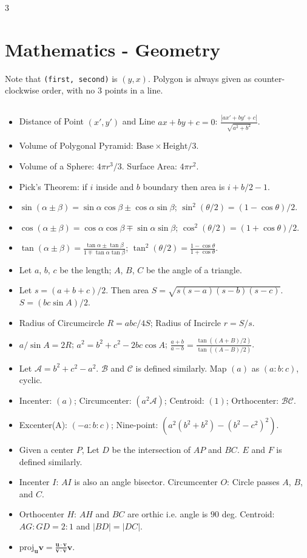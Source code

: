 \documentclass[landscape, 8pt, a4paper, oneside]{extarticle}
\begin{document}
\begin{multicols*}{3}
\section{Mathematics - Geometry}
Note that \texttt{(first, second)} is $(y, x)$.
Polygon is always given as counter-clockwise order, with no $3$ points in a line.
\subsection{}
\begin{itemize}
	\item Distance of Point $(x', y')$ and Line $ax + by + c = 0$: $\frac{|ax' + by' + c|}{\sqrt{a^2 + b^2}}$.
	\item Volume of Polygonal Pyramid: $\mathrm{Base} \times \mathrm{Height} / 3$.
	\item Volume of a Sphere: $4 \pi r^3 / 3$. Surface Area: $4 \pi r^2$.
	\item Pick's Theorem: if $i$ inside and $b$ boundary then area is $i + b/2 - 1$.
	\item $\sin(\alpha \pm \beta) = \sin \alpha \cos \beta \pm \cos \alpha \sin \beta$; $\sin^2(\theta/2) = (1 - \cos \theta) / 2$.
	\item $\cos(\alpha \pm \beta) = \cos \alpha \cos \beta \mp \sin \alpha \sin \beta$; $\cos^2(\theta/2) = (1 + \cos \theta) / 2$.
	\item $\tan(\alpha \pm \beta) = \frac{\tan \alpha \pm \tan \beta}{1 \mp \tan \alpha \tan \beta}$; $\tan^2(\theta/2) = \frac{1 - \cos \theta}{1 + \cos \theta}$.
	\item Let $a$, $b$, $c$ be the length; $A$, $B$, $C$ be the angle of a triangle.
	\item Let $s = (a+b+c)/2$. Then area $S = \sqrt{s(s-a)(s-b)(s-c)}$. $S = (bc \sin A) / 2$.
	\item Radius of Circumcircle $R = abc/4S$; Radius of Incircle $r = S/s$.
	\item $a/\sin A = 2R$; $a^2 = b^2 + c^2 - 2bc \cos A$; $\frac{a+b}{a-b} = \frac{\tan((A+B)/2)}{\tan{((A-B)/2)}}$.
	\item Let $\mathcal A = b^2 + c^2 - a^2$. $\mathcal B$ and $\mathcal C$ is defined similarly. Map $(a)$ as $(a : b : c)$, cyclic.
	\item Incenter: $(a)$; Circumcenter: $(a^2\mathcal A)$; Centroid: $(1)$; Orthocenter: $\mathcal B \mathcal C$.
	\item Excenter(A): $(-a : b : c)$; Nine-point: $(a^2(b^2+b^2) - (b^2-c^2)^2)$.
	\item Given a center $P$, Let $D$ be the intersection of $AP$ and $BC$. $E$ and $F$ is defined similarly.
	\item Incenter $I$: $AI$ is also an angle bisector. Circumcenter $O$: Circle passes $A$, $B$, and $C$.
	\item Orthocenter $H$: $AH$ and $BC$ are orthic i.e. angle is $90$ deg. Centroid: $AG : GD = 2 : 1$ and $|BD| = |DC|$.
	\item $\mathrm{proj}_{\mathbf{u}} \mathbf{v} = \frac{\mathbf{u} \cdot \mathbf{v}}{\mathbf{v} \cdot \mathbf{v}} \mathbf{v}$.
\end{itemize}

\end{multicols*}
\end{document}
